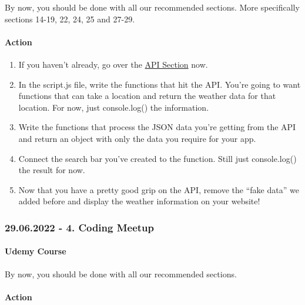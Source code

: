 \documentclass[
]{article}
\providecommand{\tightlist}{%
  \setlength{\itemsep}{0pt}\setlength{\parskip}{0pt}}
\begin{document}
By now, you should be done with all our recommended sections. More specifically sections 14-19, 22, 24, 25 and 27-29.

\hypertarget{action-2}{%
\paragraph{Action}\label{action-2}}

\begin{enumerate}
\def\labelenumi{\arabic{enumi}.}
\tightlist
\item
  If you haven't already, go over the \protect\hyperlink{api}{API Section} now.
\item
  In the script.js file, write the functions that hit the API. You're going to want functions that can take a location and return the weather data for that location. For now, just console.log() the information.
\item
  Write the functions that process the JSON data you're getting from the API and return an object with only the data you require for your app.
\item
  Connect the search bar you've created to the function. Still just console.log() the result for now.
\item
  Now that you have a pretty good grip on the API, remove the ``fake data'' we added before and display the weather information on your website!
\end{enumerate}

\hypertarget{coding-meetup-3}{%
\subsubsection*{29.06.2022 - 4. Coding Meetup}\label{coding-meetup-3}}

\hypertarget{udemy-course-3}{%
\paragraph{Udemy Course}\label{udemy-course-3}}

By now, you should be done with all our recommended sections.

\hypertarget{action-3}{%
\paragraph{Action}\label{action-3}}
\end{document}
